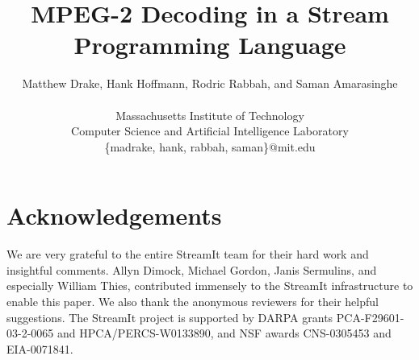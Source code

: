 \documentclass[times,10pt,twocolumn]{article}
\title{MPEG-2 Decoding in a Stream Programming Language}
\author{
  Matthew Drake, Hank Hoffmann, Rodric Rabbah, and Saman Amarasinghe\\
  \begin{twoaffiliations}
    Massachusetts Institute of Technology\\
    Computer Science and Artificial Intelligence Laboratory\\
    \{madrake, hank, rabbah, saman\}@mit.edu
  \end{twoaffiliations}
}
\begin{document}
  
  \maketitle
  \thispagestyle{empty}
  
  \begin{abstract}
    
  \end{abstract}
  
  
  
  
  
  
  
  
  
  \vspace{-2pt}
  \section*{Acknowledgements}
  \vspace{-7pt}
  We are very grateful to the entire StreamIt team for their hard work
  and insightful comments. Allyn Dimock, Michael Gordon, Janis
  Sermulins, and especially William Thies, contributed immensely to
  the StreamIt infrastructure to enable this paper. We also thank the
  anonymous reviewers for their helpful suggestions. The StreamIt
  project is supported by DARPA grants PCA-F29601-03-2-0065 and
  HPCA/PERCS-W0133890, and NSF awards CNS-0305453 and EIA-0071841.

\vspace{-2pt}

\vspace{-7pt}


\end{document}
